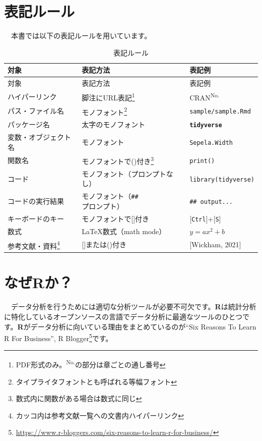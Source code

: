 \documentclass[
  12pt,
]{book}
\DeclareRobustCommand{\href}[2]{#2\footnote{\url{#1}}}
\begin{document}
\hypertarget{ux8868ux8a18ux30ebux30fcux30eb}{%
\section*{表記ルール}\label{ux8868ux8a18ux30ebux30fcux30eb}}

　本書では以下の表記ルールを用いています。

\begin{longtable}[]{@{}lll@{}}
\caption{表記ルール}\tabularnewline
\toprule
対象 & 表記方法 & 表記例 \\
\midrule
\endfirsthead
\toprule
対象 & 表記方法 & 表記例 \\
\midrule
\endhead
ハイパーリンク & 脚注にURL表記\footnote{PDF形式のみ。\textsuperscript{No.}の部分は章ごとの通し番号} & CRAN\textsuperscript{No.} \\
パス・ファイル名 & モノフォント\footnote{タイプライタフォントとも呼ばれる等幅フォント} & \texttt{sample/sample.Rmd} \\
パッケージ名 & 太字のモノフォント & \textbf{\texttt{tidyverse}} \\
変数・オブジェクト名 & モノフォント & \texttt{Sepela.Width} \\
関数名 & モノフォントで()付き\footnote{数式内に関数がある場合は数式に同じ} & \texttt{print()} \\
コード & モノフォント（プロンプトなし） & \texttt{library(tidyverse)} \\
コードの実行結果 & モノフォント（\texttt{\#\#} プロンプト） & \texttt{\#\#\ output...} \\
キーボードのキー & モノフォントで{[}{]}付き & {[}\texttt{Ctrl}{]}+{[}\texttt{S}{]} \\
数式 & \LaTeX 数式（math mode） & \(y = ax^2 + b\) \\
参考文献・資料\footnote{カッコ内は参考文献一覧への文書内ハイパーリンク} & {[}{]}または()付き & {[}Wickham, 2021{]} \\
\bottomrule
\end{longtable}

\hypertarget{ux306aux305crux304b}{%
\section*{なぜRか？}\label{ux306aux305crux304b}}

　データ分析を行うためには適切な分析ツールが必要不可欠です。\textbf{R}は統計分析に特化しているオープンソースの言語でデータ分析に最適なツールのひとつです。\textbf{R}がデータ分析に向いている理由をまとめているのが\href{https://www.r-bloggers.com/six-reasons-to-learn-r-for-business/}{``Six Reasons To Learn R For Business'', R Blogger}です。
\end{document}
